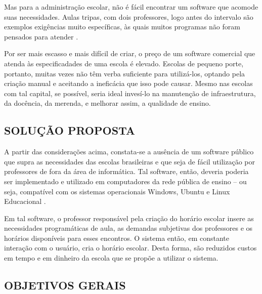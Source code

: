 \documentclass[12pt,a4paper]{article}
\begin{document}
		\par Mas para a administração escolar, não é fácil encontrar um software que acomode suas necessidades. Aulas tripas, com dois professores, logo antes do intervalo são exemplos exigências muito específicas, às quais muitos programas não foram pensados para atender \cite{nikita, carter1995}.

		\par Por ser mais escasso e mais difícil de criar, o preço de um software comercial que atenda às especificadades de uma escola é elevado. Escolas de pequeno porte, portanto, muitas vezes não têm verba suficiente para utilizá-los, optando pela criação manual e aceitando a ineficácia que isso pode causar. Mesmo nas escolas com tal capital, se possível, seria ideal invesí-lo na manutenção de infraestrutura, da docência, da merenda, e melhorar assim, a qualidade de ensino.



		\subsection{SOLUÇÃO PROPOSTA}

			 \par A partir das considerações acima, constata-se a ausência de um software público \cite{publico} que supra as necessidades das escolas brasileiras e que seja de fácil utilização por professores de fora da área de informática. Tal software, então, deveria poderia ser implementado e utilizado em computadores da rede pública de ensino -- ou seja, compatível com os sistemas operacionais Windows, Ubuntu e Linux Educacional \cite{proinfo, w3s}.

			 \par Em tal software, o professor responsável pela criação do horário escolar insere as necessidades programáticas de aula, as demandas subjetivas dos professores e os horários disponíveis para esses encontros. O sistema então, em constante interação com o usuário, cria o horário escolar.  Desta forma, são reduzidos custos em tempo e em dinheiro da escola que se propõe a utilizar o sistema.


		\subsection{OBJETIVOS GERAIS}
\end{document}
